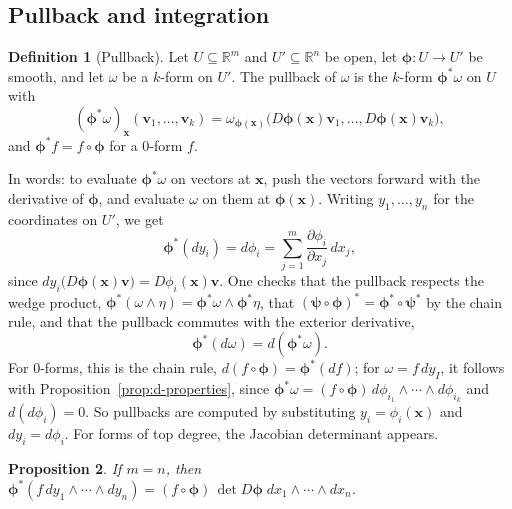 \documentclass[11pt]{article}
\theoremstyle{definition}
\newtheorem{definition}{Definition}[section]
\theoremstyle{plain}
\newtheorem{proposition}[definition]{Proposition}
\theoremstyle{remark}
\begin{document}
\subsection{Pullback and integration}

\begin{definition}[Pullback]\label{def:pullback}
    Let $U \subseteq \mathbb{R}^m$ and $U' \subseteq \mathbb{R}^n$ be open, let $\boldsymbol{\phi}: U \to U'$ be smooth, and let $\omega$ be a $k$-form on $U'$. The pullback of $\omega$ is the $k$-form $\boldsymbol{\phi}^*\omega$ on $U$ with
    \[(\boldsymbol{\phi}^*\omega)_{\mathbf{x}}(\mathbf{v}_1, \ldots, \mathbf{v}_k) = \omega_{\boldsymbol{\phi}(\mathbf{x})}\big(D\boldsymbol{\phi}(\mathbf{x})\mathbf{v}_1, \ldots, D\boldsymbol{\phi}(\mathbf{x})\mathbf{v}_k\big),\]
    and $\boldsymbol{\phi}^*f = f \circ \boldsymbol{\phi}$ for a $0$-form $f$.
\end{definition}

In words: to evaluate $\boldsymbol{\phi}^*\omega$ on vectors at $\mathbf{x}$, push the vectors forward with the derivative of $\boldsymbol{\phi}$, and evaluate $\omega$ on them at $\boldsymbol{\phi}(\mathbf{x})$. Writing $y_1, \ldots, y_n$ for the coordinates on $U'$, we get
\[\boldsymbol{\phi}^*(dy_i) = d\phi_i = \sum_{j=1}^m \frac{\partial \phi_i}{\partial x_j}\, dx_j,\]
since $dy_i\big(D\boldsymbol{\phi}(\mathbf{x})\mathbf{v}\big) = D\phi_i(\mathbf{x})\mathbf{v}$. One checks that the pullback respects the wedge product, $\boldsymbol{\phi}^*(\omega \wedge \eta) = \boldsymbol{\phi}^*\omega \wedge \boldsymbol{\phi}^*\eta$, that $(\boldsymbol{\psi} \circ \boldsymbol{\phi})^* = \boldsymbol{\phi}^* \circ \boldsymbol{\psi}^*$ by the chain rule, and that the pullback commutes with the exterior derivative,
\[\boldsymbol{\phi}^*(d\omega) = d(\boldsymbol{\phi}^*\omega).\]
For $0$-forms, this is the chain rule, $d(f \circ \boldsymbol{\phi}) = \boldsymbol{\phi}^*(df)$; for $\omega = f\, dy_I$, it follows with Proposition~\ref{prop:d-properties}, since $\boldsymbol{\phi}^*\omega = (f \circ \boldsymbol{\phi})\, d\phi_{i_1} \wedge \cdots \wedge d\phi_{i_k}$ and $d(d\phi_i) = 0$. So pullbacks are computed by substituting $y_i = \phi_i(\mathbf{x})$ and $dy_i = d\phi_i$. For forms of top degree, the Jacobian determinant appears.

\begin{proposition}\label{prop:pullback-top}
    If $m = n$, then $\boldsymbol{\phi}^*(f\, dy_1 \wedge \cdots \wedge dy_n) = (f \circ \boldsymbol{\phi})\, \det D\boldsymbol{\phi}\; dx_1 \wedge \cdots \wedge dx_n$.
\end{proposition}
\end{document}
